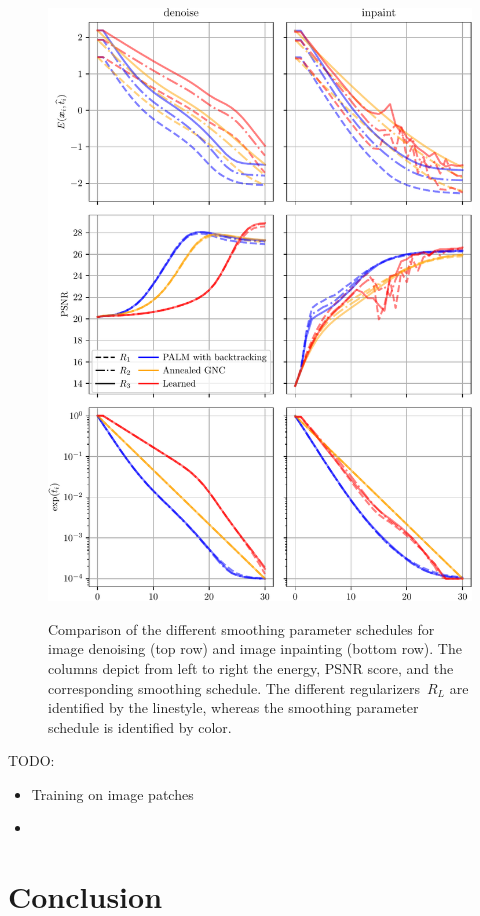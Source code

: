 \documentclass{article} %
\theoremstyle{plain}
\theoremstyle{definition}
\theoremstyle{remark}
\begin{document}
\begin{figure}[t]
    \includegraphics[width=.9\linewidth]{figures/results/plots_denoise_inpaint}
    \label{fig:plotsDenoiseInpaint}
    \caption{Comparison of the different smoothing parameter schedules for image denoising (top row) and image inpainting (bottom row).
    The columns depict from left to right the energy, PSNR score, and the corresponding smoothing schedule.
    The different regularizers~$R_L$ are identified by the linestyle, whereas the smoothing parameter schedule is identified by color.
    }
\end{figure}

TODO:
\begin{itemize}
    \item Training on image patches
    \item 
\end{itemize}

\section{Conclusion}
\end{document}

